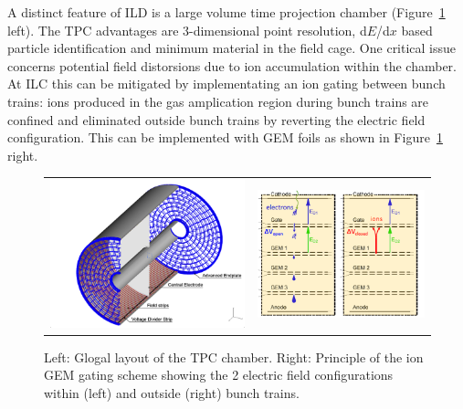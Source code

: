 A distinct feature of ILD is a large volume time projection chamber (Figure~\ref{fig:det:TPC} left). The TPC advantages are 3-dimensional point resolution, d$E$/d$x$ based particle identification and minimum material in the field cage. One critical issue concerns potential field distorsions due to ion accumulation within the chamber. At ILC this can be mitigated by implementating an ion gating between bunch trains: ions produced in the gas amplication region during bunch trains are confined and eliminated outside bunch trains by reverting the electric field configuration. This can be implemented with GEM foils as shown in Figure~\ref{fig:det:TPC} right.

\begin{figure}[t!]
\begin{tabular}{cc}
\includegraphics[width=0.6\hsize,viewport={0 -10 600 500},clip]{Detector/fig/TPC.png} &
\includegraphics[width=0.4\hsize]{Detector/fig/gating.png}
\end{tabular}
\caption[TPC layout]{Left: Glogal layout of the TPC chamber. Right: Principle of the ion GEM gating scheme showing the 2 electric field configurations within (left) and outside (right) bunch trains.}
\label{fig:det:TPC}
\end{figure}

